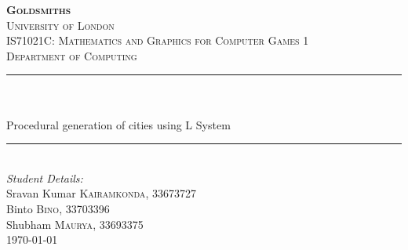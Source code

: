 \begin{titlepage}

\newcommand{\HRule}{\rule{\linewidth}{0.5mm}} %

\center %

\vspace*{\fill}\begin{center}
 
\textsc{\Huge \textbf {Goldsmiths}}\\ %
\textsc{\small University of London}\\[1.5cm] %
\textsc{\large IS71021C: Mathematics and Graphics for Computer Games 1}\\[0.5cm]
\textsc{\large Department of Computing}\\[0.5cm] %

\makeatletter
\HRule \\[0.4cm]
{ \huge \bfseries \@title}\\[0.1cm] \large Procedural generation of cities using L System
\HRule \\[1.5cm]
 
\Large \emph{Student Details:}\\ [0.2cm]
\large Sravan Kumar \textsc{Kairamkonda}, 33673727\\[0.2cm]
\large Binto \textsc{Bino}, 33703396\\[0.2cm]
\large Shubham \textsc{Maurya}, 33693375\\[2cm] %


{\large \today}\\[2cm] %


\end{center}\vspace*{\fill}
\end{titlepage}